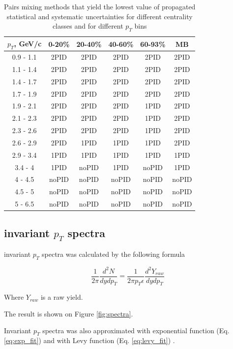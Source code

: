 \begin{table}[h!]
	\centering
	\begin{tabular}{c||c|c|c|c|c}
		$p_T$, GeV/c & 0-20\% & 20-40\% & 40-60\% & 60-93\% & MB \\
		\hline\hline
		0.9 - 1.1 & 2PID & 2PID & 2PID & 2PID & 2PID \\
		1.1 - 1.4 & 2PID & 2PID & 2PID & 2PID & 2PID \\
		1.4 - 1.7 & 2PID & 2PID & 2PID & 2PID & 2PID \\
		1.7 - 1.9 & 2PID & 2PID & 2PID & 2PID & 2PID \\
		1.9 - 2.1 & 2PID & 2PID & 2PID & 1PID & 2PID \\
		2.1 - 2.3 & 2PID & 2PID & 2PID & 1PID & 2PID \\
		2.3 - 2.6 & 2PID & 2PID & 2PID & 1PID & 2PID \\
		2.6 - 2.9 & 2PID & 1PID & 1PID & 1PID & 2PID \\
		2.9 - 3.4 & 1PID & 1PID & 1PID & 1PID & 1PID \\
		3.4 - 4 & 1PID & noPID & 1PID & noPID & 1PID \\
		4 - 4.5 & noPID & noPID & noPID & noPID & noPID \\
		4.5 - 5 & noPID & noPID & noPID & noPID & noPID \\
		5 - 6.5 & noPID & noPID & noPID & noPID & noPID \\
	\end{tabular}
	\caption{Pairs mixing methods that yield the lowest value of propagated statistical and systematic uncertainties for different centrality classes and for different $p_T$ bins}
	\label{table:methods_usage}
\end{table}

\subsection{\Kstar invariant $p_T$ spectra}
\label{section:spectra}

\Kstar invariant $p_T$ spectra was calculated by the following formula

\begin{equation}
   \frac{1}{2\pi} \frac{d^2N}{dy dp_T} = \frac{1}{2\pi p_T \epsilon} \frac{d^2 Y_{raw}}{dy dp_T}
\end{equation}

Where $Y_{raw}$ is a raw yield.

The result is shown on Figure \ref{fig:spectra}.

Invariant $p_T$ spectra was also approximated with exponential function (Eq. \ref{eq:exp_fit}) and with Levy function (Eq. \ref{eq:levy_fit}) \cite{levy1, levy2}. 

